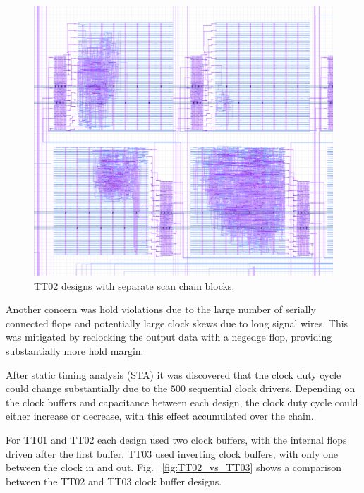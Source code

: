 \begin{figure}[htp]
\centering
\includegraphics[width=\columnwidth]{./Figs/tt02_gds_zoom.png}
\caption{TT02 designs with separate scan chain blocks.}
\label{fig:TT02_separate_scan_blocks}
\end{figure}


Another concern was hold violations due to the large number of serially connected flops and potentially large clock skews due to long signal wires.  This was mitigated by reclocking the output data with a negedge flop, providing substantially more hold margin.

After static timing analysis (STA) it was discovered that the clock duty cycle could change substantially due to the \(500\) sequential clock drivers. Depending on the clock buffers and capacitance between each design, the clock duty cycle could either increase or decrease, with this effect accumulated over the chain.

For TT01 and TT02 each design used two clock buffers, with the internal flops driven after the first buffer.
TT03 used inverting clock buffers, with only one between the clock in and out. Fig. ~\ref{fig:TT02_vs_TT03} shows a comparison between the TT02 and TT03 clock buffer designs.


